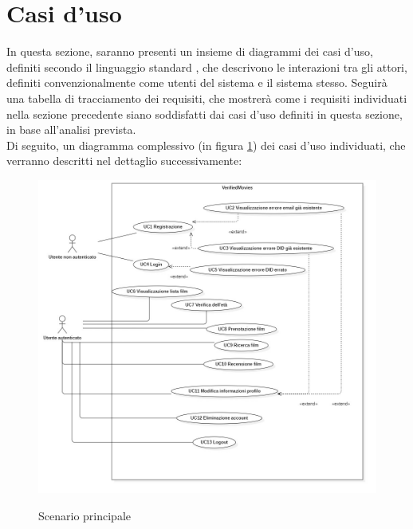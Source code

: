 \section{Casi d'uso}

In questa sezione, saranno presenti un insieme di diagrammi dei casi d'uso, definiti secondo il linguaggio standard ,
che descrivono le interazioni tra gli attori, definiti convenzionalmente come utenti del sistema e il sistema stesso. 
Seguirà una tabella di tracciamento dei requisiti, che mostrerà come i requisiti individuati nella sezione precedente siano soddisfatti
dai casi d'uso definiti in questa sezione, in base all'analisi prevista. \\

Di seguito, un diagramma complessivo (in figura \ref{fig:usecase-scenario-principale}) dei casi d'uso individuati, che verranno descritti nel dettaglio successivamente:

\begin{figure}[!ht] 
    \centering 
    \includegraphics[width=0.9\columnwidth, alt={Scenario principale dei vari casi d'uso individuati}]{immagini/usecase/scenario-principale.jpg}
    \caption{Scenario principale}\label{fig:usecase-scenario-principale}
\end{figure}

